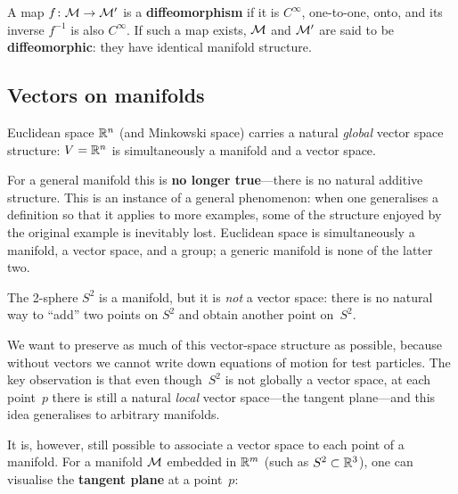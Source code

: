 

\begin{definition}[Diffeomorphism]\label{def:diffeomorphism}
  A map $f\colon\mathcal{M}\to\mathcal{M}'$ is a \textbf{diffeomorphism} if it is
  $C^\infty$, one-to-one, onto, and its inverse $f^{-1}$ is also
  $C^\infty$.  If such a map exists, $\mathcal{M}$ and $\mathcal{M}'$ are said to be
  \textbf{diffeomorphic}: they have identical manifold structure.
\end{definition}

\subsection{Vectors on manifolds}\label{sec:vectors-manifolds}

Euclidean space $\mathbb{R}^{n}$ (and Minkowski space) carries a natural
\emph{global} vector space structure: $V = \mathbb{R}^{n}$ is simultaneously
a manifold and a vector space.

For a general manifold this is \textbf{no longer true}---there is
no natural additive structure.  This is an instance of a general
phenomenon: when one generalises a definition so that it applies to
more examples, some of the structure enjoyed by the original
example is inevitably lost.  Euclidean space is simultaneously a
manifold, a vector space, and a group; a generic manifold is none
of the latter two.

\begin{example}
  The 2-sphere $S^2$ is a manifold, but it is \emph{not} a vector
  space: there is no natural way to ``add'' two points on $S^2$
  and obtain another point on~$S^2$.
\end{example}

We want to preserve as much of this vector-space structure as
possible, because without vectors we cannot write down equations of
motion for test particles.  The key observation is that even
though~$S^2$ is not globally a vector space, at each point~$p$
there is still a natural \emph{local} vector space---the tangent
plane---and this idea generalises to arbitrary manifolds.

It is, however, still possible to associate a vector space to each
point of a manifold.  For a manifold $\mathcal{M}$ embedded in $\mathbb{R}^{m}$
(such as $S^2\subset\mathbb{R}^{3}$), one can visualise the
\textbf{tangent plane} at a point~$p$:




